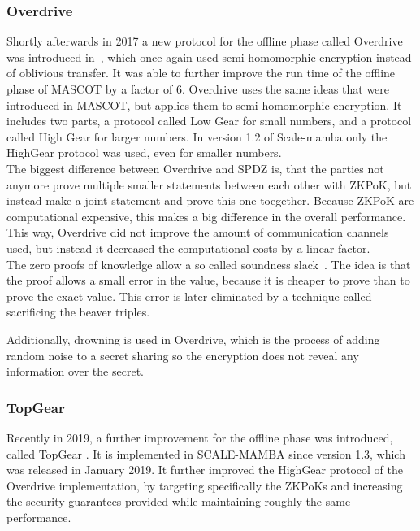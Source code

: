 \documentclass[english,runningheads,a4paper]{llncs}[2018/03/10]
\begin{document}
\subsubsection{Overdrive}
Shortly afterwards in 2017 a new protocol for the offline phase called Overdrive was introduced in~\cite{cryptoeprint:2017:1230}, which once again used semi homomorphic encryption instead of oblivious transfer. It was able to further improve the run time of the offline phase of MASCOT by a factor of 6. Overdrive uses the same ideas that were introduced in MASCOT, but applies them to semi homomorphic encryption. It includes two parts, a protocol called Low Gear for small numbers, and a protocol called High Gear for larger numbers. In version 1.2 of Scale-mamba only the HighGear protocol was used, even for smaller numbers.\\
The biggest difference between Overdrive and SPDZ is, that the parties not anymore prove multiple smaller statements between each other with ZKPoK, but instead make a joint statement and prove this one toegether. Because ZKPoK are computational expensive, this makes a big difference in the overall performance.\\
This way, Overdrive did not improve the amount of communication channels used, but instead it decreased the computational costs by a linear factor.\\
The zero proofs of knowledge allow a so called soundness slack~\cite{10.1007/978-3-319-56620-7_17}. The idea is that the proof allows a small error in the value, because it is cheaper to prove than to prove the exact value. This error is later eliminated by a technique called sacrificing the beaver triples.

Additionally, drowning is used in Overdrive, which is the process of adding random noise to a secret sharing so the encryption does not reveal any information over the secret. 

\subsubsection{TopGear}
Recently in 2019, a further improvement for the offline phase was introduced, called TopGear \cite{cryptoeprint:2019:035}. It is implemented in SCALE-MAMBA since version 1.3\cite{ScaleMambaDocu}, which was released in January 2019. It further improved the HighGear protocol of the Overdrive implementation, by targeting specifically the ZKPoKs and increasing the security guarantees provided while maintaining roughly the same performance.
\end{document}
